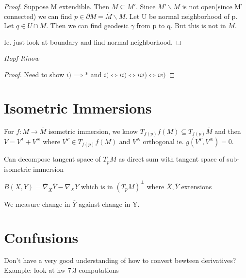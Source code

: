 \documentclass[11pt]{article}
\begin{document}
\begin{proof}
	Suppose M extendible. Then $M \subseteq M'$. Since $M' \backslash M$ is not open(since M' connected) we can find $p \in \partial M = \overline{M}\backslash M$. Let U be normal neighborhood of p. Let $q \in U \cap M$. Then we can find geodesic $\gamma$ from p to q. But this is not in $M$.

	Ie. just look at boundary and find normal neighborhood. 
\end{proof}

\begin{theorem}
	\textit{Hopf-Rinow}
\end{theorem}

\begin{proof}
	Need to show $i) \implies *$ and $i) \iff ii) \iff iii) \iff iv)$
\end{proof}

\section{Isometric Immersions}

\begin{prop}
	For $f : M \to \overline{M}$ isometric immersion, we know $T_{f(p)} f(M) \subseteq T_{f(p)} \overline{M}$ and then $V = V^T + V^N$ where $V^T \in T_{f(p)}f(M)$ and $V^N$ orthogonal ie. $\overline{g}(V^T,V^N) = 0$.
\end{prop}

\begin{remark}
	Can decompose tangent space of $T_p\overline{M}$ as direct sum with tangent space of sub-isometric immersion
\end{remark}

\begin{defi}
	$B(X,Y) = \overline{\nabla}_{\overline{X}} \overline{Y} - \nabla_X Y$ which is in $(T_p M)^{\perp}$ where $\overline{X},\overline{Y}$ extensions
\end{defi}

\begin{remark}
	We measure change in $\overline{Y}$ against change in Y.
\end{remark}





\section{Confusions}

\begin{question}
	Don't have a very good understanding of how to convert bewteen derivatives? Example: look at hw 7.3 computations
\end{question}
\end{document}
